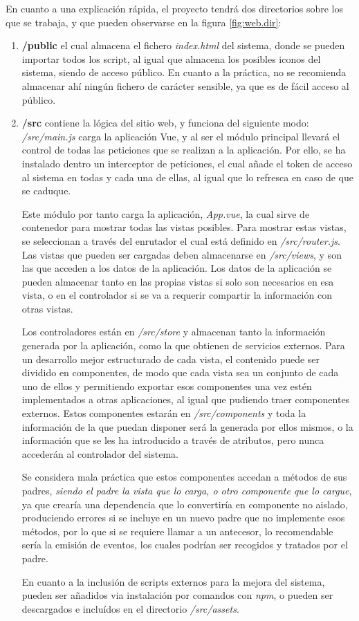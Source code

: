 En cuanto a una explicación rápida, el proyecto tendrá dos directorios sobre los que se trabaja, y que pueden observarse en la figura \ref{fig:web.dir}:
\begin{enumerate}
    \item \textbf{/public} el cual almacena el fichero \textit{index.html} del sistema, donde se pueden importar todos los script, al igual que almacena los posibles iconos del sistema, siendo de acceso público. En cuanto a la práctica, no se recomienda almacenar ahí ningún fichero de carácter sensible, ya que es de fácil acceso al público.
    
    \item \textbf{/src} contiene la lógica del sitio web, y funciona del siguiente modo:
    \textit{/src/main.js} carga la aplicación Vue, y al ser el módulo principal llevará el control de todas las peticiones que se realizan a la aplicación. Por ello, se ha instalado dentro un interceptor de peticiones, el cual añade el token de acceso al sistema en todas y cada una de ellas, al igual que lo refresca en caso de que se caduque.
    
    Este módulo por tanto carga la aplicación, \textit{App.vue}, la cual sirve de contenedor para mostrar todas las vistas posibles. Para mostrar estas vistas, se seleccionan a través del enrutador el cual está definido en \textit{/src/router.js}.
    Las vistas que pueden ser cargadas deben almacenarse en \textit{/src/views}, y son las que acceden a los datos de la aplicación. Los datos de la aplicación se pueden almacenar tanto en las propias vistas si solo son necesarios en esa vista, o en el controlador si se va a requerir compartir la información con otras vistas.
    
    Los controladores están en \textit{/src/store} y almacenan tanto la información generada por la aplicación, como la que obtienen de servicios externos.
    Para un desarrollo mejor estructurado de cada vista, el contenido puede ser dividido en componentes, de modo que cada vista sea un conjunto de cada uno de ellos y permitiendo exportar esos componentes una vez estén implementados a otras aplicaciones, al igual que pudiendo traer componentes externos.
    Estos componentes estarán en \textit{/src/components} y toda la información de la que puedan disponer será la generada por ellos mismos, o la información que se les ha introducido a través de atributos, pero nunca accederán al controlador del sistema.
    
    Se considera mala práctica que estos componentes accedan a métodos de sus padres, \textit{siendo el padre la vista que lo carga, o otro componente que lo cargue}, ya que crearía una dependencia que lo convertiría en componente no aislado, produciendo errores si se incluye en un nuevo padre que no implemente esos métodos, por lo que si se requiere llamar a un antecesor, lo recomendable sería la emisión de eventos, los cuales podrían ser recogidos y tratados por el padre.
    
    En cuanto a la inclusión de scripts externos para la mejora del sistema, pueden ser añadidos via instalación por comandos con \textit{npm}, o pueden ser descargados e incluídos en el directorio \textit{/src/assets}.
\end{enumerate}
